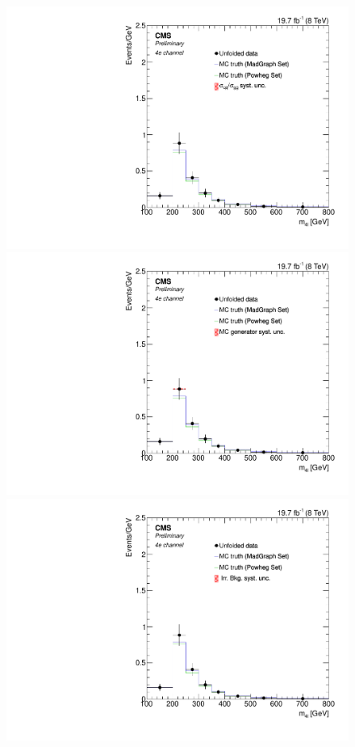 \begin{figure}[hbtp]
 \begin{center}
    \includegraphics[width=0.8\cmsFigWidth]{Figures/Unfolding/Systematics/ZZTo4e_Mass_qqgg_Pow_fr}     
    \includegraphics[width=0.8\cmsFigWidth]{Figures/Unfolding/Systematics/ZZTo4e_Mass_MCgen_Pow_fr}     
    \includegraphics[width=0.8\cmsFigWidth]{Figures/Unfolding/Systematics/ZZTo4e_Mass_IrrBkg_Pow_fr}

\end{center}
\end{figure}
